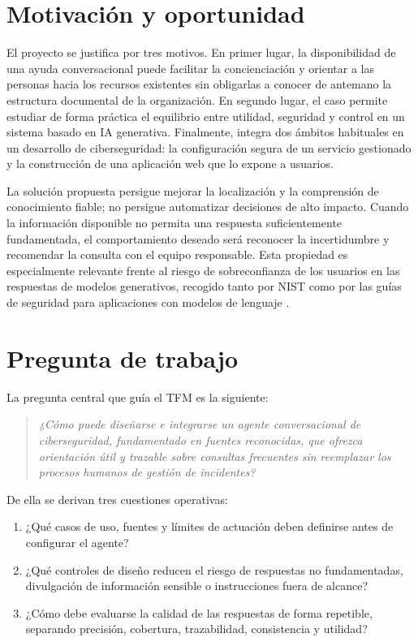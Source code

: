 \section{Motivación y oportunidad}
\label{sec:motivacion}

El proyecto se justifica por tres motivos. En primer lugar, la disponibilidad de
una ayuda conversacional puede facilitar la concienciación y orientar a las
personas hacia los recursos existentes sin obligarlas a conocer de antemano la
estructura documental de la organización. En segundo lugar, el caso permite
estudiar de forma práctica el equilibrio entre utilidad, seguridad y control en
un sistema basado en IA generativa. Finalmente, integra dos ámbitos habituales
en un desarrollo de ciberseguridad: la configuración segura de un servicio
gestionado y la construcción de una aplicación web que lo expone a usuarios.

La solución propuesta persigue mejorar la localización y la comprensión de
conocimiento fiable; no persigue automatizar decisiones de alto impacto. Cuando
la información disponible no permita una respuesta suficientemente fundamentada,
el comportamiento deseado será reconocer la incertidumbre y recomendar la
consulta con el equipo responsable. Esta propiedad es especialmente relevante
frente al riesgo de sobreconfianza de los usuarios en las respuestas de modelos
generativos, recogido tanto por NIST como por las guías de seguridad para
aplicaciones con modelos de lenguaje \cite{nistGenAi2024,owaspLlm2026}.

\section{Pregunta de trabajo}
\label{sec:pregunta-trabajo}

La pregunta central que guía el TFM es la siguiente:

\begin{quote}
\emph{¿Cómo puede diseñarse e integrarse un agente conversacional de
ciberseguridad, fundamentado en fuentes reconocidas, que ofrezca orientación
útil y trazable sobre consultas frecuentes sin reemplazar los procesos humanos
de gestión de incidentes?}
\end{quote}

De ella se derivan tres cuestiones operativas:

\begin{enumerate}
  \item ¿Qué casos de uso, fuentes y límites de actuación deben definirse antes
  de configurar el agente?
  \item ¿Qué controles de diseño reducen el riesgo de respuestas no
  fundamentadas, divulgación de información sensible o instrucciones fuera de
  alcance?
  \item ¿Cómo debe evaluarse la calidad de las respuestas de forma repetible,
  separando precisión, cobertura, trazabilidad, consistencia y utilidad?
\end{enumerate}

